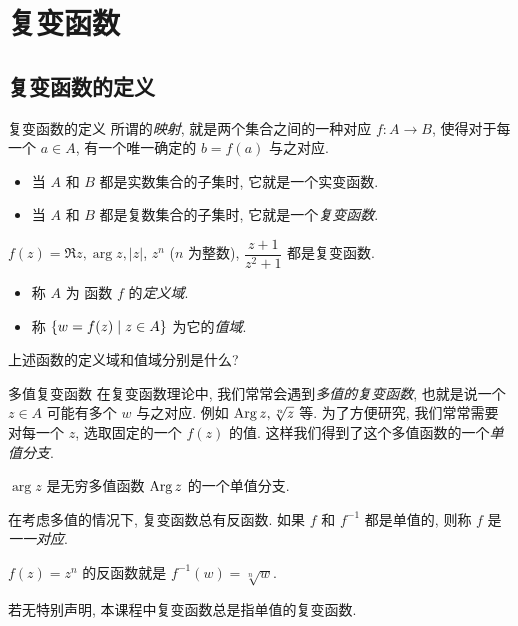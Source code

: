 \section{复变函数}

\subsection{复变函数的定义}
\begin{frame}{复变函数的定义}
	\onslide<+->
	所谓的\emph{映射}, 就是两个集合之间的一种对应 $f:A\to B$, 使得对于每一个 $a\in A$, 有一个唯一确定的 $b=f(a)$ 与之对应.
	\begin{itemize}
		\item 当 $A$ 和 $B$ 都是实数集合的子集时, 它就是一个实变函数.
		\item 当 $A$ 和 $B$ 都是复数集合的子集时, 它就是一个\emph{复变函数}.
	\end{itemize}

	\onslide<+->
	\begin{example}
		$f(z)=\Re z,\arg z,|z|$, $z^n$ ($n$ 为整数), $\dfrac{z+1}{z^2+1}$ 都是复变函数.
	\end{example}

	\onslide<+->
	\begin{definition}[复变函数的定义域和值域]
		\begin{itemize}
			\item 称 $A$ 为 函数 $f$ 的\emph{定义域}.
			\item 称 ${\left\{w=f(z)\mid z\in A\right\}}$ 为它的\emph{值域}.
		\end{itemize} 
	\end{definition}
	\onslide<+->
	上述函数的定义域和值域分别是什么?
\end{frame}


\begin{frame}{多值复变函数}
	\onslide<+->
	在复变函数理论中, 我们常常会遇到\emph{多值的复变函数}, 也就是说一个 $z\in A$ 可能有多个 $w$ 与之对应.
	\onslide<+->
	例如 $\operatorname{Arg} z,\sqrt[n]z$ 等.
	\onslide<+->
	为了方便研究, 我们常常需要对每一个 $z$, 选取固定的一个 $f(z)$ 的值.
	\onslide<+->
	这样我们得到了这个多值函数的一个\emph{单值分支}.
	\onslide<+->
	\begin{example}
		$\arg z$ 是无穷多值函数 $\operatorname{Arg} z$ 的一个单值分支.
	\end{example}

	\onslide<+->
	在考虑多值的情况下, 复变函数总有反函数.
	\onslide<+->
	如果 $f$ 和 $f^{-1}$ 都是单值的, 则称 $f$ 是\emph{一一对应}.
	\onslide<+->
	\begin{example}
		$f(z)=z^n$ 的反函数就是 $f^{-1}(w)=\sqrt[n]{w}$.
		\onslide<+->{%
			当 $n=\pm1$ 时, $f$ 是一一对应.
		}
	\end{example}

	\onslide<+->
	若无特别声明, 本课程中\alert{复变函数总是指单值的复变函数}.
\end{frame}


